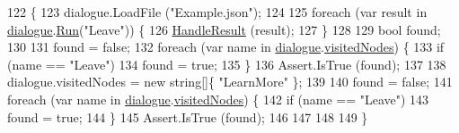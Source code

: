 \begin{DoxyCode}
122                                         \{
123             dialogue.LoadFile (\textcolor{stringliteral}{"Example.json"});
124 
125             \textcolor{keywordflow}{foreach} (var result \textcolor{keywordflow}{in} \hyperlink{a00144_a4cff5de56c4b8a91c76b6eb2d622a795}{dialogue}.\hyperlink{a00070_aead84ee50cb113ca45724894290ce9c2}{Run}(\textcolor{stringliteral}{"Leave"})) \{
126                 \hyperlink{a00144_a7b525f85a26d7c942e1cbfa5d6453893}{HandleResult} (result);
127             \}
128 
129             \textcolor{keywordtype}{bool} found;
130 
131             found = \textcolor{keyword}{false};
132             \textcolor{keywordflow}{foreach} (var name \textcolor{keywordflow}{in} \hyperlink{a00144_a4cff5de56c4b8a91c76b6eb2d622a795}{dialogue}.\hyperlink{a00070_ac5661051e0b7f44527fe526c7766dbbf}{visitedNodes}) \{
133                 \textcolor{keywordflow}{if} (name == \textcolor{stringliteral}{"Leave"})
134                     found = \textcolor{keyword}{true};
135             \}
136             Assert.IsTrue (found);
137 
138             dialogue.visitedNodes = \textcolor{keyword}{new} \textcolor{keywordtype}{string}[]\{ \textcolor{stringliteral}{"LearnMore"} \};
139 
140             found = \textcolor{keyword}{false};
141             \textcolor{keywordflow}{foreach} (var name \textcolor{keywordflow}{in} \hyperlink{a00144_a4cff5de56c4b8a91c76b6eb2d622a795}{dialogue}.\hyperlink{a00070_ac5661051e0b7f44527fe526c7766dbbf}{visitedNodes}) \{
142                 \textcolor{keywordflow}{if} (name == \textcolor{stringliteral}{"Leave"})
143                     found = \textcolor{keyword}{true};
144             \}
145             Assert.IsTrue (found);
146 
147                 
148 
149         \}
\end{DoxyCode}


